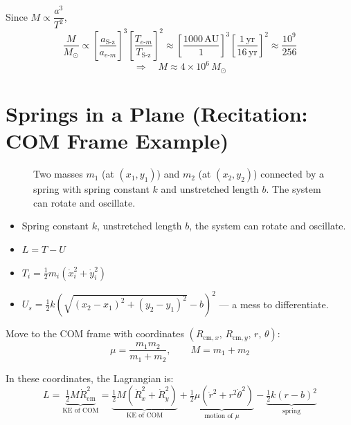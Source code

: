 \begin{example}
Since $M \propto \dfrac{a^3}{T^2}$,
\[
    \frac{M}{M_\odot} \propto
    \left[\frac{a_\text{S-z}}{a_{e\text{-}m}}\right]^3
    \left[\frac{T_{e\text{-}m}}{T_\text{S-z}}\right]^2
    \approx \left[\frac{1000\,\text{AU}}{1}\right]^3\!\left[\frac{1\,\text{yr}}{16\,\text{yr}}\right]^2
    \approx \frac{10^9}{256}
\]
\[
    \Rightarrow\quad M \approx 4 \times 10^6\,M_\odot
\]
\end{example}


\section{Springs in a Plane (Recitation: COM Frame Example)}

\begin{figure}[H]
\centering
\caption{Two masses $m_1$ (at $(x_1,y_1)$) and $m_2$ (at $(x_2,y_2)$) connected by a spring with spring constant $k$ and unstretched length $b$. The system can rotate and oscillate.}
\end{figure}

\begin{itemize}
    \item Spring constant $k$, unstretched length $b$, the system can rotate and oscillate.
    \item $L = T - U$
    \item $T_i = \tfrac{1}{2}m_i(\dot x_i^2 + \dot y_i^2)$
    \item $U_s = \tfrac{1}{2}k\!\left(\sqrt{(x_2-x_1)^2+(y_2-y_1)^2} - b\right)^2$ --- a mess to differentiate.
\end{itemize}

Move to the COM frame with coordinates $(R_{\text{cm},x},\, R_{\text{cm},y},\, r,\, \theta)$:
\[
    \mu = \frac{m_1 m_2}{m_1 + m_2}, \qquad M = m_1 + m_2
\]

In these coordinates, the Lagrangian is:
\[
    L = \underbrace{\tfrac{1}{2}M\dot{R}_\text{cm}^2}_{\text{KE of COM}}
      = \underbrace{\tfrac{1}{2}M(\dot R_x^2 + \dot R_y^2)}_{\text{KE of COM}}
      + \underbrace{\tfrac{1}{2}\mu(\dot{r}^2 + r^2\dot\theta^2)}_{\text{motion of }\mu}
      - \underbrace{\tfrac{1}{2}k(r-b)^2}_{\text{spring}}
\]

